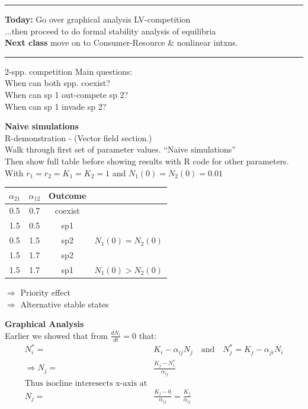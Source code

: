 \documentclass{article}
\newcommand{\note}[1]{\colorbox{gray!30}{#1}}
\newcommand{\ind}{\-\hspace{1cm}}
\begin{document}
\noindent{}
\rule[0.5ex]{\linewidth}{1pt}
\textbf{Today:} 
\ind Go over graphical analysis LV-competition \\
\ind \ind ...then proceed to do formal stability analysis of equilibria\\
\textbf{Next class} move on to Consumer-Resource \& nonlinear intxns.

\rule[0.5ex]{\linewidth}{1pt}

2-spp. competition Main questions:\\
\ind When can both spp. coexist?\\
\ind When can sp 1 out-compete sp 2?\\
\ind When can sp 1 invade sp 2?

\textbf{Naive simulations}\\
\ind \note{R-demonstration - (Vector field section.)}\\
\ind \note{Walk through first set of parameter values. ``Naive simulations''}\\
\ind \ind \note{Then show full table before showing results with R code for other parameters.}\\

\ind With $r_1 = r_2 = K_1 = K_2 = 1$ and $N_1(0) = N_2(0)=0.01$

\begin{table}[h]
\centering
\begin{tabular}{cccc}
$\alpha_{21}$ & $\alpha_{12}$ & Outcome \\ 
\hline
0.5 & 0.7 & coexist & \\
1.5 & 0.5 & sp1 & \\
0.5 & 1.5 & sp2 & $N_1(0)=N_2(0)$\\
1.5 & 1.7 & sp2 & \\
\hline
1.5 & 1.7 & sp1 & $N_1(0)>N_2(0)$\\
 \hline
\end{tabular} 
\end{table}
\ind \ind \ind \ind \ind \ind $\Rightarrow$ Priority effect\\
\ind \ind \ind \ind \ind \ind  $\Rightarrow$ Alternative stable states

\vspace{0.5cm}

\textbf{Graphical Analysis}\\
Earlier we showed that from $\frac{dN_i}{dt}=0$ that:
\begin{align*}
	N_i^* = & K_i - \alpha_{ij} N_j \quad \text{and}\quad N_j^* = K_j - \alpha_{ji} N_i\\
	\Rightarrow N_j = & \frac{K_j-N_i^*}{\alpha_{ij}}\\
	\text{Thus isocline interesects x-axis at}\\
  N_j = & \frac{K_j-0}{\alpha_{ij}}=\frac{K_j}{\alpha_{ij}}
	\end{align*}
\end{document}
